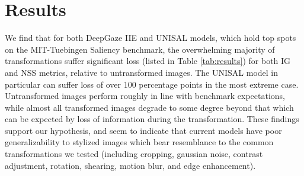 \documentclass[sigconf]{acmart}
\begin{document}
\section{Results}
We find that for both DeepGaze IIE \cite{deepgazeiie} and UNISAL models, which hold top spots
on the MIT-Tuebingen Saliency benchmark, the overwhelming majority of transformations suffer
significant loss (listed in Table \ref{tab:results}) for both IG and NSS metrics, relative to
untransformed images. The UNISAL model in particular can suffer loss of over 100 percentage
points in the most extreme case. Untransformed images perform roughly in line with benchmark
expectations, while almost all transformed images degrade to some degree beyond that which can be
expected by loss of information during the transformation. These findings support our hypothesis,
and seem to indicate that current models have poor generalizability to stylized images which bear
resemblance to the common transformations we tested (including cropping, gaussian noise, contrast
adjustment, rotation, shearing, motion blur, and edge enhancement).
\end{document}
